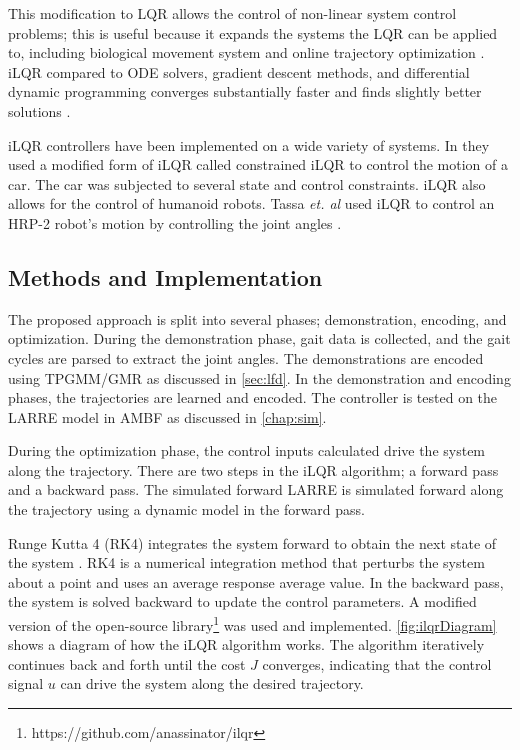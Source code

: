 This modification to LQR allows the control of non-linear system control problems; this is useful because it expands the systems the LQR can be applied to, including biological movement system \cite{iLQR_Li2004} and online trajectory optimization \cite{iLQR_tassa2012}. iLQR compared to ODE solvers, gradient descent methods, and differential dynamic programming converges substantially faster and finds slightly better solutions \cite{iLQR_Li2004}. 

iLQR controllers have been implemented on a wide variety of systems. In \cite{car} they used a modified form of iLQR called constrained iLQR to control the motion of a car. The car was subjected to several state and control constraints. iLQR also allows for the control of humanoid robots. Tassa \textit{et. al} used iLQR to control an HRP-2 robot's motion by controlling the joint angles \cite{iLQR_tassa2014}.

\subsection{Methods and Implementation}
 The proposed approach is split into several phases; demonstration, encoding, and optimization. During the demonstration phase, gait data is collected, and the gait cycles are parsed to extract the joint angles. The demonstrations are encoded using TPGMM/GMR as discussed in \autoref{sec:lfd}. In the demonstration and encoding phases, the trajectories are learned and encoded. The controller is tested on the LARRE model in AMBF as discussed in \autoref{chap:sim}. 

During the optimization phase, the control inputs calculated drive the system along the trajectory. There are two steps in the iLQR algorithm; a forward pass and a backward pass. The simulated forward LARRE is simulated forward along the trajectory using a dynamic model in the forward pass. 

Runge Kutta 4 (RK4) integrates the system forward to obtain the next state of the system \cite{dit2017runge}. RK4 is a numerical integration method that perturbs the system about a point and uses an average response average value.  In the backward pass, the system is solved backward to update the control parameters. A modified version of the open-source library\footnote{https://github.com/anassinator/ilqr} was used and implemented.  \autoref{fig:ilqrDiagram} shows a diagram of how the iLQR algorithm works. The algorithm iteratively continues back and forth until the cost $J$ converges, indicating that the control signal $u$ can drive the system along the desired trajectory. 

